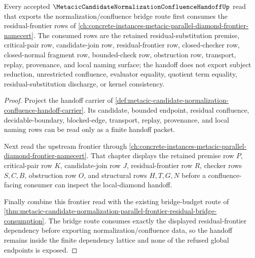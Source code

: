 \begin{theorem}
\label{thm:metacic-candidate-confluence-orphan-route}
Every accepted $\MetacicCandidateNormalizationConfluenceHandoffUp$ read that exports the normalization/confluence bridge route first consumes the residual-frontier rows of \autoref{ch:concrete-instances-metacic-parallel-diamond-frontier-namecert}. The consumed rows are the retained residual-substitution premise, critical-pair row, candidate-join row, residual-frontier row, closed-checker row, closed-normal fragment row, bounded-check row, obstruction row, transport, replay, provenance, and local naming surface; the handoff does not export subject reduction, unrestricted confluence, evaluator equality, quotient term equality, residual-substitution discharge, or kernel consistency.
\end{theorem}
\begin{proof}
Project the handoff carrier of \autoref{def:metacic-candidate-normalization-confluence-handoff-carrier}. Its candidate, bounded endpoint, residual confluence, decidable-boundary, blocked-edge, transport, replay, provenance, and local naming rows can be read only as a finite handoff packet.

Next read the upstream frontier through \autoref{ch:concrete-instances-metacic-parallel-diamond-frontier-namecert}. That chapter displays the retained premise row $P$, critical-pair row $K$, candidate-join row $J$, residual-frontier row $R$, checker rows $S,C,B$, obstruction row $O$, and structural rows $H,T,G,N$ before a confluence-facing consumer can inspect the local-diamond handoff.

Finally combine this frontier read with the existing bridge-budget route of \autoref{thm:metacic-candidate-normalization-parallel-frontier-residual-bridge-consumption}. The bridge route consumes exactly the displayed residual-frontier dependency before exporting normalization/confluence data, so the handoff remains inside the finite dependency lattice and none of the refused global endpoints is exposed.
\end{proof}
